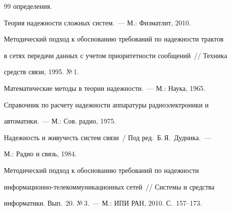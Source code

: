 {{\begin{thebibliography}{99}
определения.


     






     Теория надежности сложных систем.~--- М.: Физматлит, 2010.


     






     Методический подход к обоснованию требований по надежности трактов 


в сетях передачи данных с учетом приоритетности  сообщений~/\!\!/  Техника  


средств  связи, 1995. №\,1.


     






     Математические методы в теории надежности.~--- М.: Наука, 1965.


     






     Справочник по расчету надежности аппаратуры радиоэлектроники и 


автоматики.~--- М.: Сов. радио, 1975.


     




     Надежность и живучесть систем  связи~/  Под  ред.\  Б.\,Я.~Дудника.~--- 


М.: Радио и связь, 1984.





\label{end\stat}


     






     Методический подход к обоснованию требований по надежности 


информационно-телекоммуникационных сетей~/\!\!/ Системы и средства 


информатики. Вып.~20. №\,3.~--- М.: ИПИ РАН, 2010.  С.~157--173.


 \end{thebibliography}


}


}


